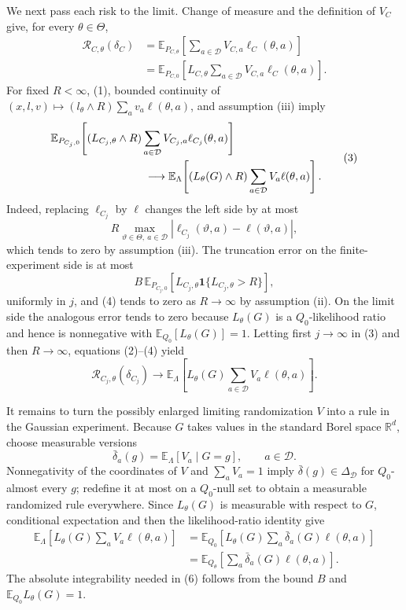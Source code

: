 We next pass each risk to the limit.  Change of measure and the definition of \(V_C\) give, for every \(\theta\in\Theta\),
\[
 \begin{aligned}
 \mathcal R_{C,\theta}(\delta_C)
 &=\mathbb E_{P_{C,\theta}}\!\left[
     \sum_{a\in\mathcal D}V_{C,a}\ell_C(\theta,a)
   \right]\\
 &=\mathbb E_{P_{C,0}}\!\left[
     L_{C,\theta}\sum_{a\in\mathcal D}V_{C,a}
     \ell_C(\theta,a)
   \right].
 \end{aligned}
 \tag{2}
\]
For fixed \(R<\infty\), (1), bounded continuity of
\((x,l,v)\mapsto(l_\theta\wedge R)\sum_a v_a\ell(\theta,a)\), and assumption (iii) imply
\[
 \begin{aligned}
 &\mathbb E_{P_{C_j,0}}\!\left[
   (L_{C_j,\theta}\wedge R)
   \sum_{a\in\mathcal D}V_{C_j,a}\ell_{C_j}(\theta,a)
 \right]\\
 &\hspace{30mm}\longrightarrow
 \mathbb E_{\Lambda}\!\left[
   (L_\theta(G)\wedge R)
   \sum_{a\in\mathcal D}V_a\ell(\theta,a)
 \right].
 \end{aligned}
 \tag{3}
\]
Indeed, replacing \(\ell_{C_j}\) by \(\ell\) changes the left side by at most
\[
 R\max_{\vartheta\in\Theta,\ a\in\mathcal D}
 |\ell_{C_j}(\vartheta,a)-\ell(\vartheta,a)|,
\]
which tends to zero by assumption (iii).  The truncation error on the finite-experiment side is at most
\[
 B\,\mathbb E_{P_{C_j,0}}\!\left[
 L_{C_j,\theta}\mathbf 1\{L_{C_j,\theta}>R\}
\right],
 \tag{4}
\]
uniformly in \(j\), and (4) tends to zero as \(R\to\infty\) by assumption (ii).  On the limit side the analogous error tends to zero because \(L_\theta(G)\) is a \(Q_0\)-likelihood ratio and hence is nonnegative with
\(\mathbb E_{Q_0}[L_\theta(G)]=1\).  Letting first \(j\to\infty\) in (3) and then \(R\to\infty\), equations (2)--(4) yield
\[
 \mathcal R_{C_j,\theta}(\delta_{C_j})
 \longrightarrow
 \mathbb E_{\Lambda}\!\left[
 L_\theta(G)\sum_{a\in\mathcal D}V_a\ell(\theta,a)
 \right].
 \tag{5}
\]

It remains to turn the possibly enlarged limiting randomization \(V\) into a rule in the Gaussian experiment.  Because \(G\) takes values in the standard Borel space \(\mathbb R^d\), choose measurable versions
\[
 \bar\delta_a(g)=\mathbb E_{\Lambda}[V_a\mid G=g],
 \qquad a\in\mathcal D.
\]
Nonnegativity of the coordinates of \(V\) and \(\sum_aV_a=1\) imply
\(\bar\delta(g)\in\Delta_{\mathcal D}\) for \(Q_0\)-almost every \(g\); redefine it at most on a \(Q_0\)-null set to obtain a measurable randomized rule everywhere.  Since \(L_\theta(G)\) is measurable with respect to \(G\), conditional expectation and then the likelihood-ratio identity give
\[
 \begin{aligned}
 \mathbb E_{\Lambda}\!\left[
 L_\theta(G)\sum_aV_a\ell(\theta,a)
 \right]
 &=\mathbb E_{Q_0}\!\left[
 L_\theta(G)\sum_a\bar\delta_a(G)\ell(\theta,a)
 \right]\\
 &=\mathbb E_{Q_\theta}\!\left[
 \sum_a\bar\delta_a(G)\ell(\theta,a)
 \right].
 \tag{6}
 \end{aligned}
\]
The absolute integrability needed in (6) follows from the bound \(B\) and
\(\mathbb E_{Q_0}L_\theta(G)=1\).

